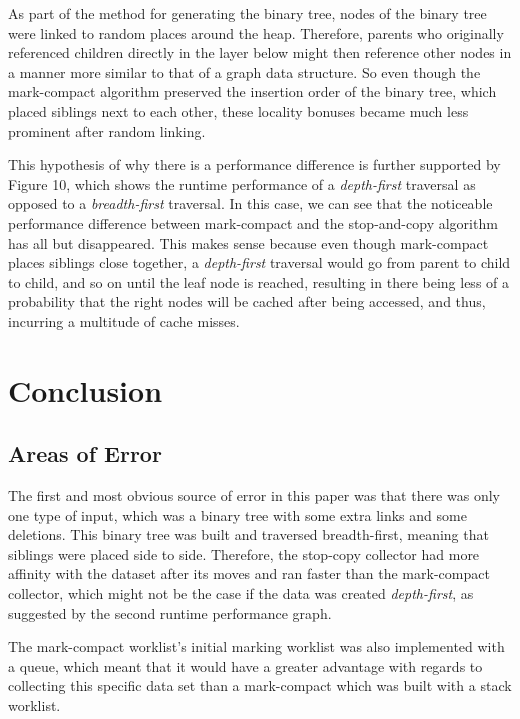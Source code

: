 \documentclass[index]{subfiles}
\begin{document}
As part of the method for generating the binary tree, nodes of the binary tree were linked to random places around the heap. Therefore, parents who originally referenced children directly in the layer below might then reference other nodes in a manner more similar to that of a graph data structure. So even though the mark-compact algorithm preserved the insertion order of the binary tree, which placed siblings next to each other, these locality bonuses became much less prominent after random linking. 

This hypothesis of why there is a performance difference is further supported by Figure 10, which shows the runtime performance of a \textit{depth-first} traversal as opposed to a \textit{breadth-first} traversal. In this case, we can see that the noticeable performance difference between mark-compact and the stop-and-copy algorithm has all but disappeared. This makes sense because even though mark-compact places siblings close together, a \textit{depth-first} traversal would go from parent to child to child, and so on until the leaf node is reached, resulting in there being less of a probability that the right nodes will be cached after being accessed, and thus, incurring a multitude of cache misses.

\section{Conclusion}

\subsection{Areas of Error}

The first and most obvious source of error in this paper was that there was only one type of input, which was a binary tree with some extra links and some deletions. This binary tree was built and traversed breadth-first, meaning that siblings were placed side to side. Therefore, the stop-copy collector had more affinity with the dataset after its moves and ran faster than the mark-compact collector, which might not be the case if the data was created \textit{depth-first}, as suggested by the second runtime performance graph. 

The mark-compact worklist's initial marking worklist was also implemented with a queue, which meant that it would have a greater advantage with regards to collecting this specific data set than a mark-compact which was built with a stack worklist. 
\end{document}

